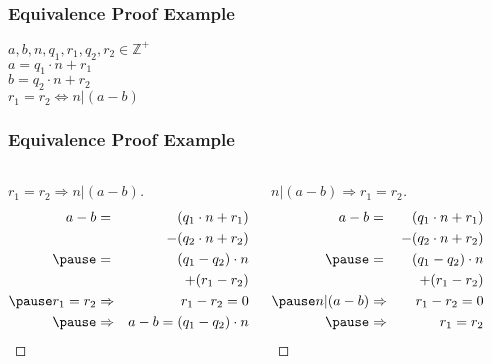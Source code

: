 \documentclass[dvipsnames]{beamer}
\begin{document}
\begin{frame}
  \frametitle{Equivalence Proof Example}

  \begin{theorem}
    $a,b,n,q_1,r_1,q_2,r_2 \in \mathbb{Z}^+$\\
    $a = q_1 \cdot n + r_1$\\
    $b = q_2 \cdot n + r_2$\\

    \bigskip
    $r_1 = r_2 \Leftrightarrow n | (a - b)$
  \end{theorem}
\end{frame}

\begin{frame}
  \frametitle{Equivalence Proof Example}

  \begin{columns}[t]
    \begin{proof}[$r_1 = r_2 \Rightarrow n | (a - b)$]
      \begin{eqnarray*}
        a - b & = & (q_1 \cdot n + r_1)\\
              &   & -(q_2 \cdot n + r_2)\\\pause
              & = & (q_1 - q_2) \cdot n\\
              &   & + (r_1 - r_2)\\\pause
        r_1 = r_2 & \Rightarrow & r_1 - r_2 = 0\\\pause
                  & \Rightarrow & a - b = (q_1 - q_2) \cdot n
      \end{eqnarray*}
    \end{proof}

    \pause
    \begin{proof}[$n | (a - b) \Rightarrow r_1 = r_2$]
      \begin{eqnarray*}
        a - b & = & (q_1 \cdot n + r_1)\\
              &   & -(q_2 \cdot n + r_2)\\\pause
              & = & (q_1 - q_2) \cdot n\\
              &   & + (r_1 - r_2)\\\pause
        n | (a - b) & \Rightarrow & r_1 - r_2 = 0\\\pause
                    & \Rightarrow & r_1 = r_2
      \end{eqnarray*}
    \end{proof}
  \end{columns}
\end{frame}
\end{document}
